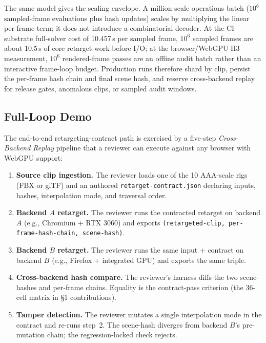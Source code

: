 \documentclass[sigconf,nonacm]{acmart}
\begin{document}
The same model gives the scaling envelope. A million-scale operations batch
($10^6$ sampled-frame evaluations plus hash updates) scales by multiplying
the linear per-frame term; it does not introduce a combinatorial decoder. At
the CI-substrate full-solver cost of 10.457\,\textmu{}s per sampled frame,
$10^6$ sampled frames are about 10.5\,s of core retarget work before I/O; at
the browser/WebGPU H3 measurement, $10^6$ rendered-frame passes are an offline
audit batch rather than an interactive frame-loop budget. Production runs
therefore shard by clip, persist the per-frame hash chain and final scene hash,
and reserve cross-backend replay for release gates, anomalous clips, or sampled
audit windows.

\subsection{Full-Loop Demo}
\label{sec:eval:fullloop}

The end-to-end retargeting-contract path is exercised by a five-step
\emph{Cross-Backend Replay} pipeline that a reviewer can execute
against any browser with WebGPU support:

\begin{enumerate}
  \item \textbf{Source clip ingestion.} The reviewer loads one of the
    10 AAA-scale rigs (FBX or glTF) and an authored
    \texttt{retarget-contract.json} declaring inputs, hashes,
    interpolation mode, and traversal order.
  \item \textbf{Backend $A$ retarget.} The reviewer runs the contracted
    retarget on backend $A$ (e.g., Chromium + RTX 3060) and exports
    \texttt{(retargeted-clip, per-frame-hash-chain, scene-hash)}.
  \item \textbf{Backend $B$ retarget.} The reviewer runs the same input
    + contract on backend $B$ (e.g., Firefox + integrated GPU)
    and exports the same triple.
  \item \textbf{Cross-backend hash compare.} The reviewer's harness
    diffs the two scene-hashes and per-frame chains. Equality is the
    contract-pass criterion (the 36-cell matrix in §1 contributions).
  \item \textbf{Tamper detection.} The reviewer mutates a single
    interpolation mode in the contract and re-runs step~2. The
    scene-hash diverges from backend $B$'s pre-mutation chain;
    the regression-locked check rejects.
\end{enumerate}
\end{document}
